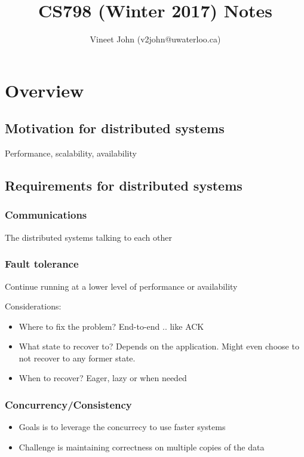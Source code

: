 \documentclass[a4paper]{article}
\begin{document}
\title{CS798 (Winter 2017) Notes}
\author{Vineet John (v2john@uwaterloo.ca)}
\date{}        
\maketitle

\section{Overview}

\subsection{Motivation for distributed systems}
Performance, scalability, availability

\subsection{Requirements for distributed systems}

\subsubsection{Communications}
The distributed systems talking to each other

\subsubsection{Fault tolerance}

Continue running at a lower level of performance or availability

Considerations: 
\begin{itemize}
    \item
    Where to fix the problem? End-to-end .. like ACK
    \item
    What state to recover to? Depends on the application. Might even choose to not recover to any former state. 
    \item
    When to recover? Eager, lazy or when needed
\end{itemize}

\subsubsection{Concurrency/Consistency}

\begin{itemize}
    \item
    Goals is to leverage the concurrecy to use faster systems
    \item
    Challenge is maintaining correctness on multiple copies of the data
\end{itemize}
\end{document}
